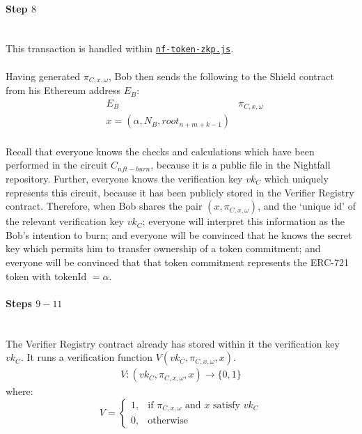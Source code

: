 \documentclass{article}
\begin{document}
\paragraph{Step $8$}
\ \\
This transaction is handled within \hyperref[sec:nf-token-zkp]{\texttt{nf-token-zkp.js}}.\\
\\
Having generated $\pi_{C,x,\omega}$, Bob then sends the following to the Shield contract from his Ethereum address $E_B$:
\begin{align*}
  &E_B
  &\pi_{C,x,\omega}\\
  &x = (\alpha, N_{B}, root_{n+m+k-1})
\end{align*}
\\
Recall that everyone knows the checks and calculations which have been performed in the circuit $C_{nft-burn}$, because it is a public file in the Nightfall repository. Further, everyone knows the verification key $vk_C$ which uniquely represents this circuit, because it has been publicly stored in the Verifier Registry contract. Therefore, when Bob shares the pair $(x, \pi_{C,x,\omega})$, and the `unique id' of the relevant verification key $vk_C$; everyone will interpret this information as the Bob's intention to burn; and everyone will be convinced that he knows the secret key which permits him to transfer ownership of a token commitment; and everyone will be convinced that that token commitment represents the ERC-721 token with tokenId $=\alpha$.



\paragraph{Steps $9 - 11$}
\ \\
The Verifier Registry contract already has stored within it the verification key $vk_C$.
It runs a verification function $V(vk_C, \pi_{C,x,\omega}, x)$.
\begin{align*}
  V: (vk_C, \pi_{C,x,\omega}, x) \to \{0,1\}
\end{align*}
where:
\[
    V=
\begin{cases}
    1,& \text{if } \pi_{C,x,\omega} \text{ and } x \text{ satisfy } vk_C\\
    0,& \text{otherwise}
\end{cases}
\]
\end{document}
